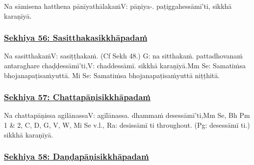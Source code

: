 Na sāmisena hatthena pānīyathālakaṁ\makeatletter\hyperlink{endnote-appendix}\makeatother V: pāṇiya-. paṭiggahessāmī'ti, sikkhā karaṇīyā.



\subsubsection*{\hyperref[training56]{Sekhiya 56: Sasitthakasikkhāpadaṁ}}
\label{sekh56}

Na sasitthakaṁ\makeatletter\hyperlink{endnote-appendix}\makeatother V: sasiṭṭhakaṁ. (Cf Sekh 48.) G: na sitthakaṁ. pattadhovanaṁ antaraghare chaḍḍessāmī'ti,\makeatletter\hyperlink{endnote-appendix}\makeatother V: chaddessāmī. sikkhā karaṇīyā.\makeatletter\hyperlink{endnote-appendix}\makeatother Mm Se: Samatiṁsa bhojanapaṭisaṁyuttā. Mi Se: Samatiṁsa bhojanapaṭisaṁyuttā
niṭṭhitā.



\subsubsection*{\hyperref[training57]{Sekhiya 57: Chattapāṇisikkhāpadaṁ}}
\label{sekh57}

Na chattapāṇissa agilānassa\makeatletter\hyperlink{endnote-appendix}\makeatother V: agīlānassa. dhammaṁ desessāmī'ti,\makeatletter\hyperlink{endnote-appendix}\makeatother Mm Se, Bh Pm 1 & 2, C, D, G, V, W, Mi Se v.l., Ra: desissāmī ti throughout. (Pg: desessāmī ti.) sikkhā karaṇīyā.



\subsubsection*{\hyperref[training58]{Sekhiya 58: Daṇḍapāṇisikkhāpadaṁ}}
\label{sekh58}

